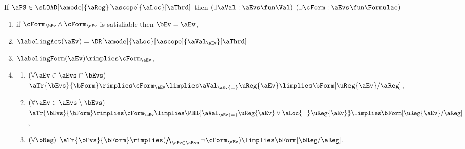 \medskip
If $\aPS \in \sLOAD[\amode]{\aReg}[\ascope]{\aLoc}[\aThrd]$ then
$(\exists\aVal:\aEvs\fun\Val)$
$(\exists\cForm:\aEvs\fun\Formulae)$
\begin{enumerate}[topsep=0pt,label=(\textsc{r}\arabic*),ref=\textsc{r}\arabic*]
\item \label{read-E-x}
  if $\cForm_\bEv\land\cForm_\aEv$ is satisfiable then $\bEv=\aEv$,
\item \label{read-lambda-x}
  $\labelingAct(\aEv) = \DR[\amode]{\aLoc}[\ascope]{\aVal_\aEv}[\aThrd]$
\item \label{read-kappa-x}
  \begin{math}
    \labelingForm(\aEv) \rimplies
    \cForm_\aEv
  \end{math},
  
\item[] 
  \begin{enumerate}[leftmargin=0pt]
  \item \label{read-tau-dependent-x}
    \begin{math}
      (\forall\aEv\in\aEvs\cap\bEvs)
    \end{math}
    \begin{math}
      \aTr{\bEvs}{\bForm} \rimplies
      \cForm_\aEv
      \limplies \aVal_\aEv{=}\uReg{\aEv}
      \limplies \bForm[\uReg{\aEv}/\aReg]
    \end{math},
    
  \item \label{read-tau-independent-x}
    \begin{math}
      (\forall\aEv\in\aEvs\setminus\bEvs)
    \end{math}
    \begin{math}
      \aTr{\bEvs}{\bForm} \rimplies
      \cForm_\aEv 
      \limplies
      \PBR{\aVal_\aEv{=}\uReg{\aEv} \lor \aLoc{=}\uReg{\aEv}}
      \limplies
      \bForm[\uReg{\aEv}/\aReg]
    \end{math},
    
  \item \label{read-tau-empty-x}
    \begin{math}
      (\forall\bReg)
    \end{math}
    \begin{math}
      \aTr{\bEvs}{\bForm} \rimplies 
      (\bigwedge_{\aEv\in\aEvs}\lnot\cForm_\aEv)
      \limplies 
      \bForm[\bReg/\aReg].
    \end{math}  
  \end{enumerate}  
\end{enumerate}
\medskip



